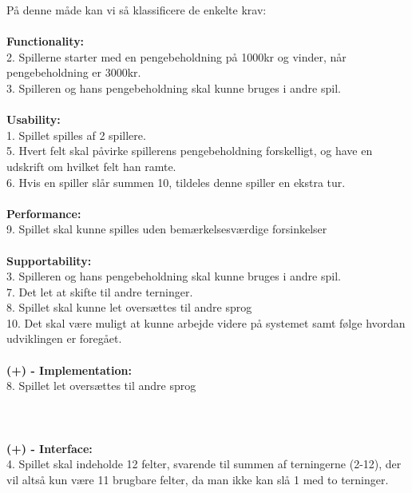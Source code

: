\noindent På denne måde kan vi så klassificere de enkelte krav:
\\\\\textbf{Functionality:}
\\ 2. Spillerne starter med en pengebeholdning på 1000kr og vinder, når pengebeholdning er 3000kr.
\\ 3. Spilleren og hans pengebeholdning skal kunne bruges i andre spil.
\\\\\textbf{Usability:}
\\1. Spillet spilles af 2 spillere.
\\ 5. Hvert felt skal påvirke spillerens pengebeholdning forskelligt, og have en udskrift om hvilket felt han ramte.
\\ 6. Hvis en spiller slår summen 10, tildeles denne spiller en ekstra tur.
\\\\\textbf{Performance:}
\\9. Spillet skal kunne spilles uden bemærkelsesværdige forsinkelser
\\\\\textbf{Supportability:}
\\ 3. Spilleren og hans pengebeholdning skal kunne bruges i andre spil.
\\ 7. Det let at skifte til andre terninger.
\\ 8. Spillet skal kunne let oversættes til andre sprog
\\ 10. Det skal være muligt at kunne arbejde videre på systemet samt følge hvordan udviklingen er foregået.
\\\\\textbf{(+) - Implementation:}
\\ 8. Spillet let oversættes til andre sprog
\\\\\\\\\textbf{(+) - Interface:}
\\ 4. Spillet skal indeholde 12 felter, svarende til summen af terningerne (2-12), der vil altså kun være 11 brugbare felter, da man ikke kan slå 1 med to terninger.

